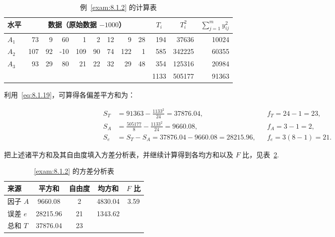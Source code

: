 \begin{table}[htbp]
  \centering
  \caption{例~\ref{exam:8.1.2} 的计算表}
    \begin{tabular}{rrrrrrrrrrrr}
    \toprule
    \multicolumn{1}{l}{水平} & \multicolumn{8}{c}{数据（原始数据 $-1000$）}                             & \multicolumn{1}{c}{$T_i$} & \multicolumn{1}{c}{$T_i^2$} & \multicolumn{1}{c}{$\sum_{j=1}^{m} y_{ij}^2$} \\
    \midrule
    \multicolumn{1}{l}{$A_1$} & 73    & 9     & 60    & 1     & 2     & 12    & 9     & 28    & 194   & 37636 & 10024 \\
    \multicolumn{1}{l}{$A_2$} & 107   & 92    & -10   & 109   & 90    & 74    & 122   & 1     & 585   & 342225 & 60355 \\
    \multicolumn{1}{l}{$A_3$} & 93    & 29    & 80    & 21    & 22    & 32    & 29    & 48    & 354   & 125316 & 20984 \\
    \midrule
          &       &       &       &       &       &       &       &       & 1133  & 505177 & 91363 \\
    \bottomrule
    \end{tabular}%
  \label{tab:8.1.4}%
\end{table}%

利用~\eqref{eq:8.1.19}，可算得各偏差平方和为：

\begin{align*}
S_T & = 91363 - \frac{1133^2}{24} = 37876.04, && f_T = 24-1=23,\\
S_A &= \frac{505177}{8} - \frac{1133^2}{24} = 9660.08, && f_A = 3 - 1 = 2,\\
S_e &= S_{T} - S_A = 37876.04 - 9660.08 = 28215.96, && f_{e} = 3(8-1)=21.
\end{align*}

把上述诸平方和及其自由度填入方差分析表，并继续计算得到各均方和以及 $F$ 比，见表~\ref{tab:8.1.5}.

\begin{table}[htbp]
  \centering
  \caption{\ref{exam:8.1.2} 的方差分析表}
    \begin{tabular}{lcccc}
    \toprule
    来源    & 平方和   & 自由度   & 均方和   & $F$ 比 \\
    \midrule
    因子 $A$  & 9660.08 & 2     & 4830.04 & 3.59 \\
    误差 $e$  & 28215.96 & 21    & 1343.62 &  \\
    总和 $T$  & 37876.04 & 23    &       &  \\
    \bottomrule
    \end{tabular}%
  \label{tab:8.1.5}%
\end{table}%



